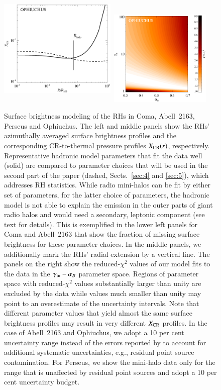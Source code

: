 \documentclass[useAMS,usenatbib]{mn2e}
\begin{document}
\begin{figure}
\includegraphics[width=5.6cm,height=5.6cm,keepaspectratio]{figures/XCR_Ophiuchus.eps}
\includegraphics[width=5cm,height=4.6cm]{figures/ProbOphiuchus.eps}
%
\caption{Surface brightness modeling of the RHs in Coma, Abell~2163, Perseus and
  Ophiuchus. The left and middle panels show the RHs' azimuthally averaged
  surface brightness profiles and the corresponding CR-to-thermal pressure
  profiles $X_{{\mathrm{CR}}}(r)$, respectively. Representative hadronic model
  parameters that fit the data well (solid) are compared to parameter choices
  that will be used in the second part of the paper (dashed, Sects.~\ref{sec:4}
  and \ref{sec:5}), which addresses RH statistics. While radio mini-halos can be
  fit by either set of parameters, for the latter choice of parameters, the
  hadronic model is not able to explain the emission in the outer parts of giant
  radio halos and would need a secondary, leptonic component (see text for
  details). This is exemplified in the lower left panels for Coma and Abell~2163
  that show the fraction of missing surface brightness for these parameter
  choices. In the middle panels, we additionally mark the RHs' radial extension
  by a vertical line. The panels on the right show the reduced-$\chi^2$ values
  of our model fits to the data in the $\gamma_{{\mathrm{tu}}}-\alpha_{B}$ parameter
  space.  Regions of parameter space with reduced-$\chi^2$ values substantially
  larger than unity are excluded by the data while values much smaller than
  unity may point to an overestimate of the uncertainty intervals. Note that
  different parameter values that yield almost the same surface brightness
  profiles may result in very different $X_{{\mathrm{CR}}}$ profiles. In the case of
  Abell~2163 and Ophiuchus, we adopt a 10 per cent uncertainty range instead of
  the errors reported by \citet{2009A&A...499..679M} to account for additional
  systematic uncertainties, e.g., residual point source contamination. For
  Perseus, we show the mini-halo data only for the range that is unaffected by
  residual point sources \citep{1990MNRAS.246..477P} and adopt a 10 per cent
  uncertainty budget.}
\label{fig:SBmodeling}
\end{figure}
\end{document}
